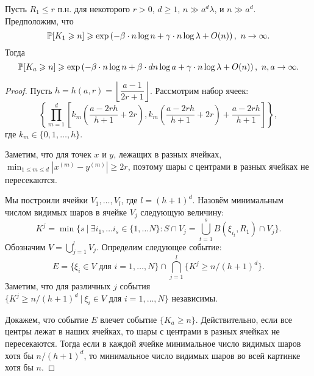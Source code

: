 \begin{thm}
Пусть $R_1\leq r$ п.н. для некоторого $r>0$, $d\geq 1$, $n \gg a^d\lambda$, и $n\gg a^d$. 
Предположим, что 
\begin{equation*}
    \mathbb{P}[K_1 \geqslant n] \geqslant \exp \left(-\beta\cdot n\log n + \gamma\cdot n\log\lambda + O(n)\right),\  n \to \infty.
 \end{equation*}{}
Тогда 
\begin{equation*}
    \mathbb{P}[K_a \geqslant n] \geqslant \exp \left(-\beta\cdot n\log n + \beta\cdot dn\log a + \gamma\cdot n\log\lambda + O(n)\right),\  n, a \to \infty.
\end{equation*}{}
\end{thm}

\begin{proof}
Пусть $h = h(a, r) = \left\lfloor\dfrac{a-1}{2r+1}\right\rfloor$. Рассмотрим набор ячеек:
\begin{equation*}
    \left\{\prod_{m = 1}^d\left[k_m\left(\dfrac{a - 2rh}{h+1} + 2r\right), k_m\left(\dfrac{a - 2rh}{h+1} + 2r\right) + \dfrac{a - 2rh}{h+1}\right]\right\},
\end{equation*}{}
где $k_m\in \{0, 1, \ldots, h\}$.

Заметим, что для точек $x$ и $y$, лежащих в разных ячейках, $\min_{1\leq m\leq d} |x^{(m)} - y^{(m)}| \geq 2r$, поэтому шары с центрами в разных ячейках не пересекаются. 

Мы построили ячейки $V_1, \ldots, V_l$, где $l = (h+1)^d$. Назовём минимальным числом видимых шаров в ячейке $V_j$ следующую величину:
\begin{equation*}
    K^j = \min\{s\ |\ \exists i_1, \ldots i_s \in \{1, \ldots N\} \colon S \cap V_j = \bigcup_{t = 1}^s B(\xi_{i_t}, R_1)\cap V_j \}.
\end{equation*}{}
Обозначим $V = \bigcup_{j=1}^l V_j$. 
Определим следующее событие:
\begin{equation*}
    E = \{\xi_i \in V \text{ для } i = 1, \ldots, N\} \cap \bigcap_{j = 1}^l\{K^j \geq n/(h+1)^d\}.
\end{equation*}{}
Заметим, что для различных $j$ события $\{K^j \geq n/(h+1)^d\ |\ \xi_i \in V \text{ для } i = 1, \ldots, N\}$ независимы.

Докажем, что событие $E$ влечет событие $\{K_a \geq n\}$. Действительно, если все центры лежат в наших ячейках, то шары с центрами в разных ячейках не пересекаются. Тогда если в каждой ячейке минимальное число видимых шаров хотя бы $n/(h+1)^d$, то минимальное число видимых шаров во всей картинке хотя бы $n$.


\end{proof}
